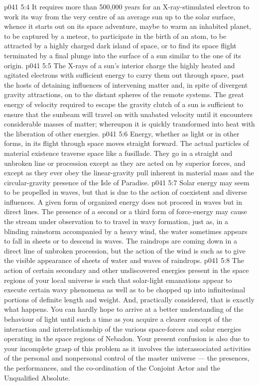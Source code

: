 \vs p041 5:4 It requires more than 500,000 years for an X\hyp{}ray\hyp{}stimulated electron to work its way from the very centre of an average sun up to the solar surface, whence it starts out on its space adventure, maybe to warm an inhabited planet, to be captured by a meteor, to participate in the birth of an atom, to be attracted by a highly charged dark island of space, or to find its space flight terminated by a final plunge into the surface of a sun similar to the one of its origin.
\vs p041 5:5 The X\hyp{}rays of a sun’s interior charge the highly heated and agitated electrons with sufficient energy to carry them out through space, past the hosts of detaining influences of intervening matter and, in spite of divergent gravity attractions, on to the distant spheres of the remote systems. The great energy of velocity required to escape the gravity clutch of a sun is sufficient to ensure that the sunbeam will travel on with unabated velocity until it encounters considerable masses of matter; whereupon it is quickly transformed into heat with the liberation of other energies.
\vs p041 5:6 \pc Energy, whether as light or in other forms, in its flight through space moves straight forward. The actual particles of material existence traverse space like a fusillade. They go in a straight and unbroken line or procession except as they are acted on by superior forces, and except as they ever obey the linear\hyp{}gravity pull inherent in material mass and the circular\hyp{}gravity presence of the Isle of Paradise.
\vs p041 5:7 \pc Solar energy may seem to be propelled in waves, but that is due to the action of coexistent and diverse influences. A given form of organized energy does not proceed in waves but in direct lines. The presence of a second or a third form of force\hyp{}energy may cause the stream under observation to  to travel in wavy formation, just as, in a blinding rainstorm accompanied by a heavy wind, the water sometimes appears to fall in sheets or to descend in waves. The raindrops are coming down in a direct line of unbroken procession, but the action of the wind is such as to give the visible appearance of sheets of water and waves of raindrops.
\vs p041 5:8 The action of certain secondary and other undiscovered energies present in the space regions of your local universe is such that solar\hyp{}light emanations appear to execute certain wavy phenomena as well as to be chopped up into infinitesimal portions of definite length and weight. And, practically considered, that is exactly what happens. You can hardly hope to arrive at a better understanding of the behaviour of light until such a time as you acquire a clearer concept of the interaction and interrelationship of the various space\hyp{}forces and solar energies operating in the space regions of Nebadon. Your present confusion is also due to your incomplete grasp of this problem as it involves the interassociated activities of the personal and nonpersonal control of the master universe --- the presences, the performances, and the co\hyp{}ordination of the Conjoint Actor and the Unqualified Absolute.
